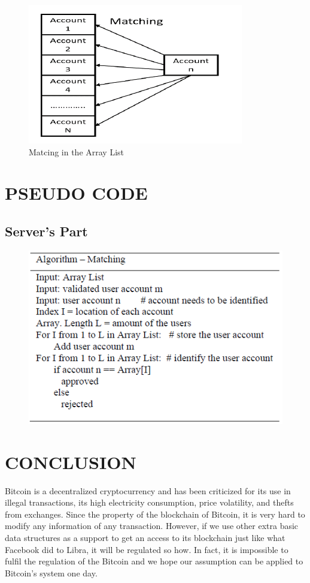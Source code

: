 \documentclass[conference]{IEEEtran}
\begin{document}
\begin{figure}[ht]
	\centering
	\includegraphics[scale=0.6]{fig1.png}
	\caption{Matcing in the Array List}
	\label{fig:label}
\end{figure}

\section{PSEUDO CODE}
\subsection{Server’s Part}
\begin{figure}[ht]	
	\centering
	\includegraphics[scale=0.4]{ALG_M.png}
\end{figure}

\section{CONCLUSION}
Bitcoin is a decentralized cryptocurrency and has been criticized for its use in illegal transactions, its high electricity consumption, price volatility, and thefts from exchanges. Since the property of the blockchain of Bitcoin, it is very hard to modify any information of any transaction. However, if we use other extra basic data structures as a support to get an access to its blockchain just like what Facebook did to Libra, it will be regulated so how. In fact, it is impossible to fulfil the regulation of the Bitcoin and we hope our assumption can be applied to Bitcoin’s system one day.
\end{document}
